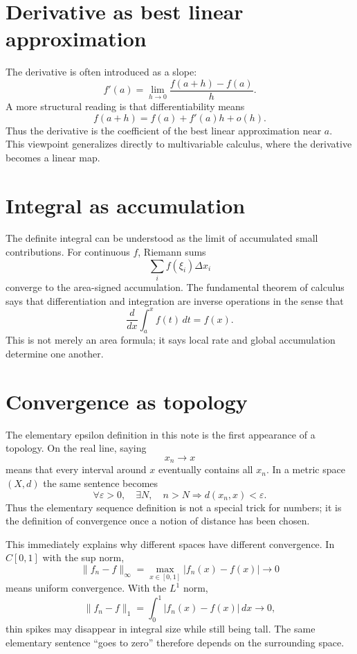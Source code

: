 \section{Derivative as best linear approximation}

The derivative is often introduced as a slope:
\[
  f'(a)=\lim_{h\to0}\frac{f(a+h)-f(a)}h.
\]
A more structural reading is that differentiability means
\[
  f(a+h)=f(a)+f'(a)h+o(h).
\]
Thus the derivative is the coefficient of the best linear approximation near \(a\).  This viewpoint generalizes directly to multivariable calculus, where the derivative becomes a linear map.

\section{Integral as accumulation}

The definite integral can be understood as the limit of accumulated small contributions.  For continuous \(f\), Riemann sums
\[
  \sum_i f(\xi_i)\Delta x_i
\]
converge to the area-signed accumulation.  The fundamental theorem of calculus says that differentiation and integration are inverse operations in the sense that
\[
  \frac{d}{dx}\int_a^x f(t)\,dt=f(x).
\]
This is not merely an area formula; it says local rate and global accumulation determine one another.

\section{Convergence as topology}

The elementary epsilon definition in this note is the first appearance of a topology.  On the real line, saying
\[
  x_n\to x
\]
means that every interval around $x$ eventually contains all $x_n$.  In a metric space $(X,d)$ the same sentence becomes
\[
  \forall \varepsilon>0,\quad \exists N,\quad n>N\Rightarrow d(x_n,x)<\varepsilon.
\]
Thus the elementary sequence definition is not a special trick for numbers; it is the definition of convergence once a notion of distance has been chosen.

This immediately explains why different spaces have different convergence.  In $C[0,1]$ with the sup norm,
\[
  \|f_n-f\|_\infty=\max_{x\in[0,1]}|f_n(x)-f(x)|\to0
\]
means uniform convergence.  With the $L^1$ norm,
\[
  \|f_n-f\|_1=\int_0^1 |f_n(x)-f(x)|\,dx\to0,
\]
thin spikes may disappear in integral size while still being tall.  The same elementary sentence ``goes to zero'' therefore depends on the surrounding space.

